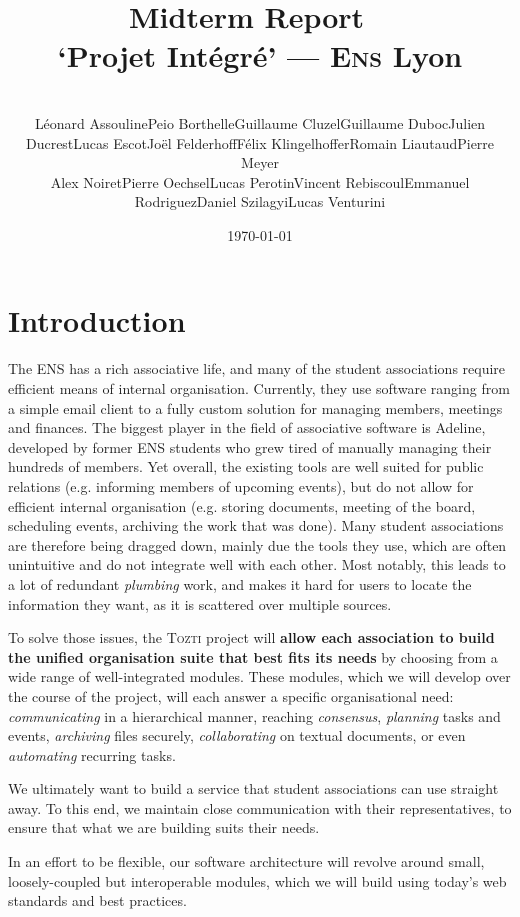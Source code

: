 \documentclass[a4paper, english]{report}
\title{
  \tozti Midterm Report ~\\[1cm]
  \large `Projet Intégré' --- \textsc{Ens} Lyon
}
\author{\begin{minipage}[c]{.8\textwidth}
\rule{\textwidth}{1pt}
\begin{multicols}{2}
\begin{itemize}
\item Léonard Assouline
\item Peio Borthelle
\item Guillaume Cluzel
\item Guillaume Duboc
\item Julien Ducrest
\item Lucas Escot
\item Joël Felderhoff
\item Félix Klingelhoffer
\item Romain Liautaud
\item Pierre Meyer
\end{itemize}
\columnbreak
\begin{itemize}
\item Alex Noiret
\item Pierre Oechsel
\item Lucas Perotin
\item Vincent Rebiscoul
\item Emmanuel Rodriguez
\item Daniel Szilagyi
\item Lucas Venturini
\end{itemize}
\end{multicols}
\rule{\textwidth}{1pt}
\end{minipage}}
\date{\today}
\newcommand{\tozti}{\textsc{Tozti}\xspace}
\begin{document}
\maketitle

\tableofcontents %

\newpage

\chapter{Introduction}
The ENS has a rich associative life, and many of the student associations require efficient means of internal organisation. Currently, they use software ranging from a simple email client to a fully custom solution for managing members, meetings and finances. The biggest player in the field of associative software is Adeline, developed by former ENS students who grew tired of manually managing their hundreds of members. Yet overall, the existing tools are well suited for public relations (e.g. informing members of upcoming events), but do not allow for efficient internal organisation (e.g. storing documents, meeting of the board, scheduling events, archiving the work that was done). Many student associations are therefore being dragged down, mainly due the tools they use, which are often unintuitive and do not integrate well with each other. Most notably, this leads to a lot of redundant \emph{plumbing} work, and makes it hard for users to locate the information they want, as it is scattered over multiple sources.

To solve those issues, the \tozti project will {\bfseries allow each association to build the unified organisation suite that best fits its needs} by choosing from a wide range of well-integrated modules. These modules, which we will develop over the course of the project, will each answer a specific organisational need: \emph{communicating} in a hierarchical manner, reaching \emph{consensus}, \emph{planning} tasks and events, \emph{archiving} files securely, \emph{collaborating} on textual documents, or even \emph{automating} recurring tasks.

We ultimately want to build a service that student associations can use straight away. To this end, we maintain close communication with their representatives, to ensure that what we are building suits their needs.

In an effort to be flexible, our software architecture will revolve around small, loosely-coupled but interoperable modules, which we will build using today's web standards and best practices.
\end{document}
